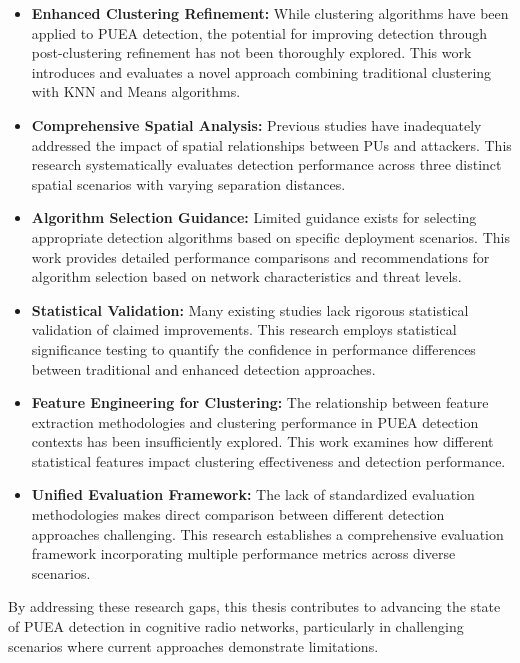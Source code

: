 \begin{itemize}
    \item \textbf{Enhanced Clustering Refinement:} While clustering algorithms have been applied to PUEA detection, the potential for improving detection through post-clustering refinement has not been thoroughly explored. This work introduces and evaluates a novel approach combining traditional clustering with KNN and Means algorithms.
    
    \item \textbf{Comprehensive Spatial Analysis:} Previous studies have inadequately addressed the impact of spatial relationships between PUs and attackers. This research systematically evaluates detection performance across three distinct spatial scenarios with varying separation distances.
    
    \item \textbf{Algorithm Selection Guidance:} Limited guidance exists for selecting appropriate detection algorithms based on specific deployment scenarios. This work provides detailed performance comparisons and recommendations for algorithm selection based on network characteristics and threat levels.
    
    \item \textbf{Statistical Validation:} Many existing studies lack rigorous statistical validation of claimed improvements. This research employs statistical significance testing to quantify the confidence in performance differences between traditional and enhanced detection approaches.
    
    \item \textbf{Feature Engineering for Clustering:} The relationship between feature extraction methodologies and clustering performance in PUEA detection contexts has been insufficiently explored. This work examines how different statistical features impact clustering effectiveness and detection performance.
    
    \item \textbf{Unified Evaluation Framework:} The lack of standardized evaluation methodologies makes direct comparison between different detection approaches challenging. This research establishes a comprehensive evaluation framework incorporating multiple performance metrics across diverse scenarios.
\end{itemize}

By addressing these research gaps, this thesis contributes to advancing the state of PUEA detection in cognitive radio networks, particularly in challenging scenarios where current approaches demonstrate limitations.
